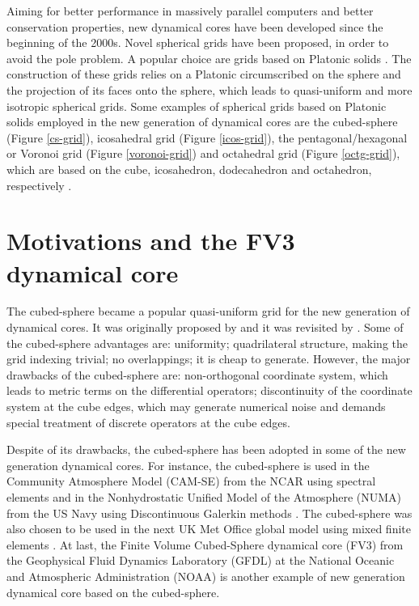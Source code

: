 Aiming for better performance in massively parallel computers and better conservation properties, 
new dynamical cores have been developed since the beginning of the 2000s.
Novel spherical grids have been proposed, in order to avoid the pole problem.
A popular choice are grids based on Platonic solids \citep{stan:2012}.
The construction of these grids relies on a Platonic circumscribed on the sphere and 
the projection of its faces onto the sphere, which leads to quasi-uniform and more isotropic
spherical grids.
Some examples of spherical grids based on Platonic solids employed in the new generation
of dynamical cores are the cubed-sphere (Figure \ref{cs-grid}), icosahedral grid (Figure \ref{icos-grid}), 
the pentagonal/hexagonal or Voronoi grid (Figure \ref{voronoi-grid}) and octahedral grid (Figure \ref{octg-grid}),
which are based on the cube, icosahedron, dodecahedron and octahedron, respectively \citep{ullrich:2017}.

\section{Motivations and the FV3 dynamical core}
The cubed-sphere became a popular quasi-uniform grid for the new generation of dynamical cores.
It was originally proposed by \citet{sadourny:1972} and it was revisited by \citet{ronchi:1996}.
Some of the cubed-sphere advantages are: uniformity; quadrilateral structure, 
making the grid indexing trivial; no overlappings; it is cheap to generate.
However, the major drawbacks of the cubed-sphere are: non-orthogonal coordinate system, which
leads to metric terms on the differential operators; discontinuity of the coordinate system
at the cube edges, which may generate numerical noise and
demands special treatment of discrete operators at the cube edges.

Despite of its drawbacks, the cubed-sphere has been adopted in some of the new generation
dynamical cores.
For instance, the cubed-sphere is used in the 
Community Atmosphere Model (CAM-SE) from the NCAR using spectral elements \citep{dennis:2012} and in the
Nonhydrostatic Unified Model of the Atmosphere (NUMA) from the US Navy using Discontinuous Galerkin 
methods \citep{giraldo:2013}. The cubed-sphere was also chosen to be used in the next UK Met Office
global model using mixed finite elements \citep{melvin:2022}.
At last, the Finite­ Volume Cubed-Sphere dynamical core (FV3) from the Geophysical Fluid 
Dynamics Laboratory (GFDL) {at} the National Oceanic and Atmospheric Administration (NOAA)
\citep{putman:2007,harris:2013} is another example
of new generation dynamical core based on the cubed-sphere.

